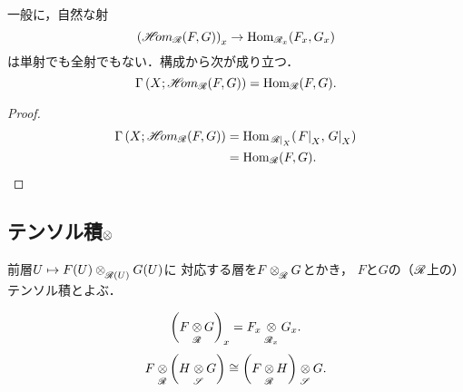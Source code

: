 一般に，自然な射
\begin{equation}
    \left(\HOM_{\scR}(F,G)\right)_{x}
    \to
    \Hom_{\scR_{x}}(F_{x},G_{x})
\end{equation}
は単射でも全射でもない．構成から次が成り立つ．
\begin{equation}
    \Gamma\left(X;\HOM_{\scR}(F,G)\right)
    =\Hom_{\scR}(F,G).
\end{equation}
\begin{proof}
    \begin{align*}
        \Gamma\left(X;\HOM_{\scR}(F,G)\right)
        &=\Hom_{\mres[\scR]{X}}(\mres[F]{X},\mres[G]{X})\\    
        &=\Hom_{\scR}(F,G).    
    \end{align*}        
\end{proof}

\subsection*{テンソル積\(\ttens\)}
\begin{leftbar}
    \begin{DFN}
        前層\(U\mapsto F(U)\ttens[\scR(U)]G(U)\)に
        対応する層を\(F\ttens[\scR]G\)とかき，
        \(F\)と\(G\)の（\(\scR\)上の）テンソル積とよぶ．
    \end{DFN}    
\end{leftbar}

\begin{equation}
    \left(F\ttens[\scR]G\right)_x
    =F_x\ttens[\scR_x]G_x.\label{eq227}
\end{equation}
\begin{equation}
    F\ttens[\scR]\left(H\ttens[\scS]G\right)
    \cong
    \left(F\ttens[\scR]H\right)\ttens[\scS]G.\label{eq228}
\end{equation}

